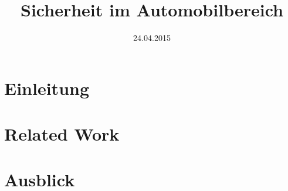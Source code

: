 \documentclass{IEEEtran}
\begin{document}
\title{Sicherheit im Automobilbereich}
\author{
}
\date{24.04.2015}
\maketitle

\begin{abstract}%

\end{abstract}

\section{Einleitung}


\section{Related Work}


% 

% 

% 

\section{Ausblick}


%


\end{document}

